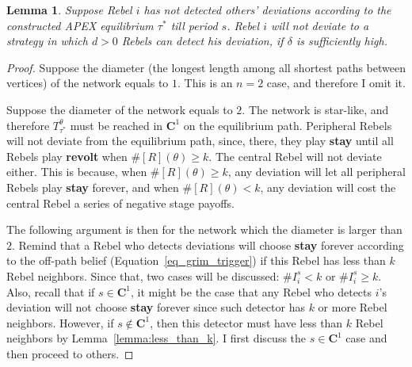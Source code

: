 \documentclass[12pt,letter]{article}
\newcommand{\Kappa}{\mathbf{C}}
\newcommand{\Omicron}{\mathbf{O}}
\newtheorem{lemma}{Lemma}[section]
\theoremstyle{definition}
\theoremstyle{remark}
\theoremstyle{claim}
\begin{document}
\begin{lemma} Suppose Rebel $i$ has not detected others' deviations according to the constructed APEX equilibrium $\tau^{*}$ till period $s$. Rebel $i$ will not deviate to a strategy in which $d>0$ Rebels can detect his deviation, if $\delta$ is sufficiently high.
\end{lemma}

\begin{proof}



Suppose the diameter (the longest length among all shortest paths between vertices) of the network equals to $1$. This is an $n=2$ case, and therefore I omit it. 

Suppose the diameter of the network equals to $2$. The network is star-like, and therefore $T^{\theta}_{\tau^{*}}$ must be reached in $\Kappa^1$ on the equilibrium path. Peripheral Rebels will not deviate from the equilibrium path, since, there, they play \textbf{stay} until all Rebels play \textbf{revolt} when $\#[R](\theta)\geq k$. The central Rebel will not deviate either. This is because, when $\#[R](\theta)\geq k$, any deviation will let all peripheral Rebels play \textbf{stay} forever, and when $\#[R](\theta)< k$, any deviation will cost the central Rebel a series of negative stage payoffs.

The following argument is then for the network which the diameter is larger than $2$. Remind that a Rebel who detects deviations will choose \textbf{stay} forever according to the off-path belief (Equation~\ref{eq_grim_trigger}) if this Rebel has less than $k$ Rebel neighbors. Since that, two cases will be discussed: $\#I^s_i< k$ or $\#I^s_i\geq k$. Also, recall that if $s\in \Kappa^1$, it might be the case that any Rebel who detects $i$'s deviation will not choose \textbf{stay} forever since such detector has $k$ or more Rebel neighbors. However, if $s\not\in \Kappa^1$, then this detector must have less than $k$ Rebel neighbors by Lemma~\ref{lemma:less_than_k}. I first discuss the $s\in \Kappa^1$ case and then proceed to others.


\end{proof}
\end{document}
